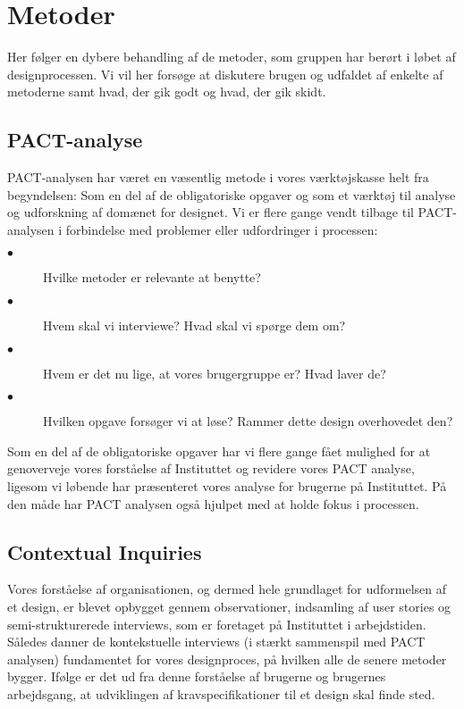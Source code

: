 \section{Metoder}
Her følger en dybere behandling af de metoder, som gruppen har berørt i løbet af designprocessen. Vi vil her forsøge at diskutere brugen og udfaldet af enkelte af metoderne samt hvad, der gik godt og hvad, der gik skidt.

\subsection{PACT-analyse}
PACT-analysen har været en væsentlig metode i vores værktøjskasse helt fra begyndelsen: Som en del af de obligatoriske opgaver og som et værktøj til analyse og udforskning af domænet for designet.
Vi er flere gange vendt tilbage til PACT-analysen i forbindelse med problemer eller udfordringer i processen: 
\begin{description}
\item[$\bullet$] Hvilke metoder er relevante at benytte?
\item[$\bullet$] Hvem skal vi interviewe? Hvad skal vi spørge dem om?
\item[$\bullet$] Hvem er det nu lige, at vores brugergruppe er? Hvad laver de?
\item[$\bullet$] Hvilken opgave forsøger vi at løse? Rammer dette design overhovedet den?
\end{description}
Som en del af de obligatoriske opgaver har vi flere gange fået mulighed for at genoverveje vores forståelse af Instituttet og revidere vores PACT analyse, ligesom vi løbende har præsenteret vores analyse for brugerne på Instituttet. På den måde har PACT analysen også hjulpet med at holde fokus i processen.

\subsection{Contextual Inquiries}
Vores forståelse af organisationen, og dermed hele grundlaget for udformelsen af et design, er blevet opbygget gennem observationer, indsamling af user stories og semi-strukturerede interviews, som er foretaget på Instituttet i arbejdstiden. 
Således danner de kontekstuelle interviews (i stærkt sammenspil med PACT analysen) fundamentet for vores designproces, på hvilken alle de senere metoder bygger. Ifølge \citep{Benyon} er det ud fra denne forståelse af brugerne og brugernes arbejdsgang, at udviklingen af kravspecifikationer til et design skal finde sted.


